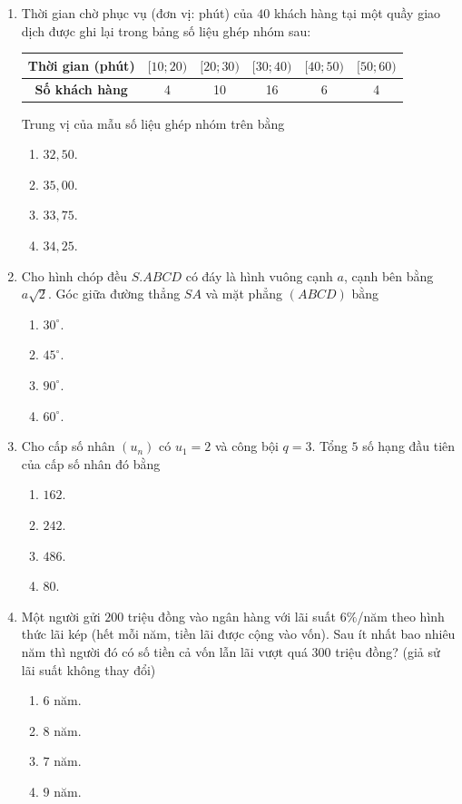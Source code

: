 \documentclass[12pt,a4paper]{article}
\begin{document}
\begin{enumerate}[label=\textbf{Câu \arabic*:}, leftmargin=*]
\item Thời gian chờ phục vụ (đơn vị: phút) của $40$ khách hàng tại một quầy giao dịch được ghi lại trong bảng số liệu ghép nhóm sau:
\begin{center}
\begin{tabular}{|c|c|c|c|c|c|}
\hline
\textbf{Thời gian (phút)} & $[10; 20)$ & $[20; 30)$ & $[30; 40)$ & $[40; 50)$ & $[50; 60)$ \\ \hline
\textbf{Số khách hàng} & 4 & 10 & 16 & 6 & 4 \\ \hline
\end{tabular}
\end{center}
Trung vị của mẫu số liệu ghép nhóm trên bằng
\begin{enumerate}[label=\Alph*.]
    \item $32{,}50$.
    \item $35{,}00$.
    \item $33{,}75$.
    \item $34{,}25$.
\end{enumerate}

\item Cho hình chóp đều $S.ABCD$ có đáy là hình vuông cạnh $a$, cạnh bên bằng $a\sqrt{2}$. Góc giữa đường thẳng $SA$ và mặt phẳng $(ABCD)$ bằng
\begin{enumerate}[label=\Alph*.]
    \item $30^\circ$.
    \item $45^\circ$.
    \item $90^\circ$.
    \item $60^\circ$.
\end{enumerate}

\item Cho cấp số nhân $(u_n)$ có $u_1 = 2$ và công bội $q = 3$. Tổng $5$ số hạng đầu tiên của cấp số nhân đó bằng
\begin{enumerate}[label=\Alph*.]
    \item $162$.
    \item $242$.
    \item $486$.
    \item $80$.
\end{enumerate}

\item Một người gửi $200$ triệu đồng vào ngân hàng với lãi suất $6\%$/năm theo hình thức lãi kép (hết mỗi năm, tiền lãi được cộng vào vốn). Sau ít nhất bao nhiêu năm thì người đó có số tiền cả vốn lẫn lãi vượt quá $300$ triệu đồng? (giả sử lãi suất không thay đổi)
\begin{enumerate}[label=\Alph*.]
    \item $6$ năm.
    \item $8$ năm.
    \item $7$ năm.
    \item $9$ năm.
\end{enumerate}


\end{enumerate}
\end{document}
